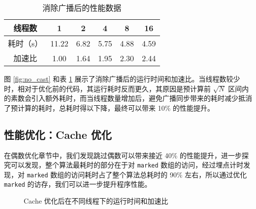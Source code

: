 \documentclass[11pt]{article}
\begin{document}
  \begin{table}[h]
    \centering
    \caption{消除广播后的性能数据}
    \label{tab:no_cast}
    \begin{tabular}{cccccc}
      \hline
      线程数 & 1 & 2 & 4 & 8 & 16 \\
      \hline
      耗时（s） & 11.22 & 6.82 & 5.75 & 4.88 & 4.59 \\
      \hline
      加速比 & 1.00 & 1.64 & 1.95 & 2.30 & 2.44 \\
      \hline
    \end{tabular}
  \end{table}
  图 \ref{fig:no_cast} 和表 \ref{tab:no_cast} 展示了消除广播后的运行时间和加速比。当线程数较少时，相对于优化前的代码，其运行耗时反而更久，其原因是预计算前 $\sqrt{N}$ 区间内的素数会引入额外耗时，而当线程数量增加后，避免广播同步带来的耗时减少抵消了预计算的耗时，总耗时得以下降，最终可以带来 10\% 的性能提升。

  \subsection{性能优化：Cache 优化}
  在偶数优化章节中，我们发现跳过偶数可以带来接近 40\% 的性能提升，进一步探究可以发现，整个算法最耗时的部分在于对 \verb|marked| 数组的访问，经过埋点计时发现，对 \verb|marked| 数组的访问耗时占了整个算法总耗时的 90\% 左右，所以通过优化 \verb|marked| 的访存，我们可以进一步提升程序性能。

  \begin{figure}[h]
    \centering
    \label{fig:no_even}
    \caption{Cache 优化后在不同线程下的运行时间和加速比}
  \end{figure}
\end{document}
